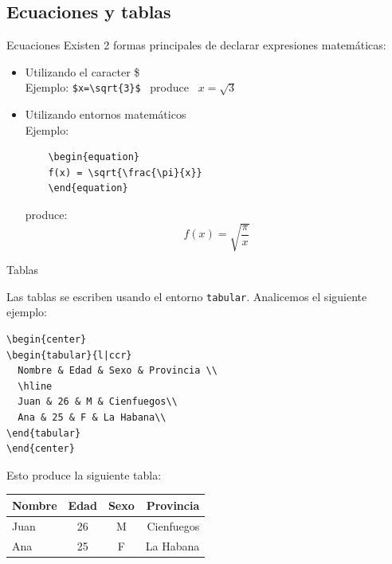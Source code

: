 \subsection{Ecuaciones y tablas}
\begin{frame}[fragile]{Ecuaciones}
Existen 2 formas principales de declarar expresiones matemáticas:
\begin{itemize}
  \item Utilizando el caracter \$\\
    Ejemplo: \texttt{\$x=\textbackslash sqrt\{3\}\$} ~produce~ $x=\sqrt{3}$\\[1mm]
  \item Utilizando entornos matemáticos\\
    Ejemplo:
    \begin{lstlisting}
    \begin{equation}
    f(x) = \sqrt{\frac{\pi}{x}}
    \end{equation}
    \end{lstlisting}
    produce:
    \begin{equation}
    f(x) = \sqrt{\frac{\pi}{x}}
    \end{equation}
\end{itemize}
\end{frame}

\begin{frame}[fragile]{Tablas}

Las tablas se escriben usando el entorno \texttt{tabular}. Analicemos el
siguiente ejemplo:

\begin{lstlisting}
\begin{center}
\begin{tabular}{l|ccr}
  Nombre & Edad & Sexo & Provincia \\
  \hline
  Juan & 26 & M & Cienfuegos\\
  Ana & 25 & F & La Habana\\
\end{tabular}
\end{center}
\end{lstlisting}

Esto produce la siguiente tabla:

\begin{center}
\begin{tabular}{l|ccr}
  Nombre & Edad & Sexo & Provincia \\
  \hline
  Juan & 26 & M & Cienfuegos\\
  Ana & 25 & F & La Habana\\
\end{tabular}
\end{center}

\end{frame}

